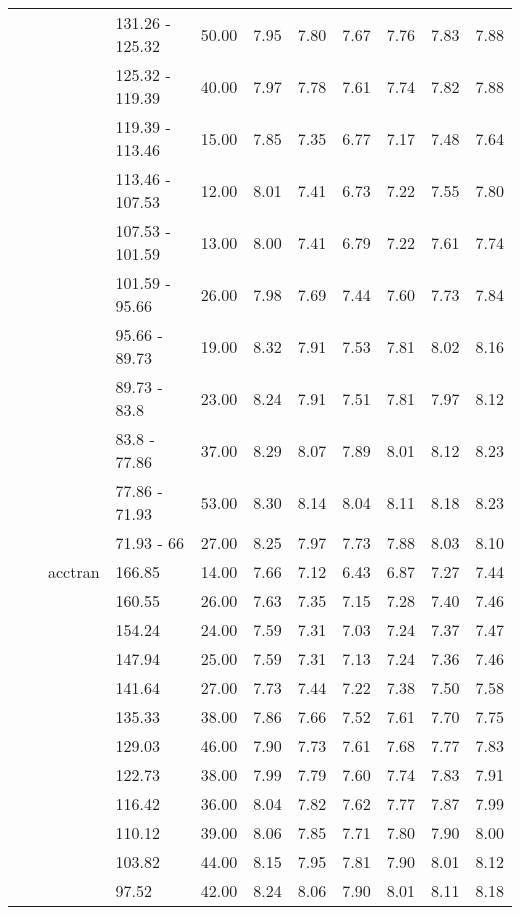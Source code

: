 \begin{longtable}{llllrrrrrrr}
   &  &  & 131.26 - 125.32 & 50.00 & 7.95 & 7.80 & 7.67 & 7.76 & 7.83 & 7.88 \\ 
   &  &  & 125.32 - 119.39 & 40.00 & 7.97 & 7.78 & 7.61 & 7.74 & 7.82 & 7.88 \\ 
   &  &  & 119.39 - 113.46 & 15.00 & 7.85 & 7.35 & 6.77 & 7.17 & 7.48 & 7.64 \\ 
   &  &  & 113.46 - 107.53 & 12.00 & 8.01 & 7.41 & 6.73 & 7.22 & 7.55 & 7.80 \\ 
   &  &  & 107.53 - 101.59 & 13.00 & 8.00 & 7.41 & 6.79 & 7.22 & 7.61 & 7.74 \\ 
   &  &  & 101.59 - 95.66 & 26.00 & 7.98 & 7.69 & 7.44 & 7.60 & 7.73 & 7.84 \\ 
   &  &  & 95.66 - 89.73 & 19.00 & 8.32 & 7.91 & 7.53 & 7.81 & 8.02 & 8.16 \\ 
   &  &  & 89.73 - 83.8 & 23.00 & 8.24 & 7.91 & 7.51 & 7.81 & 7.97 & 8.12 \\ 
   &  &  & 83.8 - 77.86 & 37.00 & 8.29 & 8.07 & 7.89 & 8.01 & 8.12 & 8.23 \\ 
   &  &  & 77.86 - 71.93 & 53.00 & 8.30 & 8.14 & 8.04 & 8.11 & 8.18 & 8.23 \\ 
   &  &  & 71.93 - 66 & 27.00 & 8.25 & 7.97 & 7.73 & 7.88 & 8.03 & 8.10 \\ 
   &  & acctran & 166.85 & 14.00 & 7.66 & 7.12 & 6.43 & 6.87 & 7.27 & 7.44 \\ 
   &  &  & 160.55 & 26.00 & 7.63 & 7.35 & 7.15 & 7.28 & 7.40 & 7.46 \\ 
   &  &  & 154.24 & 24.00 & 7.59 & 7.31 & 7.03 & 7.24 & 7.37 & 7.47 \\ 
   &  &  & 147.94 & 25.00 & 7.59 & 7.31 & 7.13 & 7.24 & 7.36 & 7.46 \\ 
   &  &  & 141.64 & 27.00 & 7.73 & 7.44 & 7.22 & 7.38 & 7.50 & 7.58 \\ 
   &  &  & 135.33 & 38.00 & 7.86 & 7.66 & 7.52 & 7.61 & 7.70 & 7.75 \\ 
   &  &  & 129.03 & 46.00 & 7.90 & 7.73 & 7.61 & 7.68 & 7.77 & 7.83 \\ 
   &  &  & 122.73 & 38.00 & 7.99 & 7.79 & 7.60 & 7.74 & 7.83 & 7.91 \\ 
   &  &  & 116.42 & 36.00 & 8.04 & 7.82 & 7.62 & 7.77 & 7.87 & 7.99 \\ 
   &  &  & 110.12 & 39.00 & 8.06 & 7.85 & 7.71 & 7.80 & 7.90 & 8.00 \\ 
   &  &  & 103.82 & 44.00 & 8.15 & 7.95 & 7.81 & 7.90 & 8.01 & 8.12 \\ 
   &  &  & 97.52 & 42.00 & 8.24 & 8.06 & 7.90 & 8.01 & 8.11 & 8.18 \\ 

\end{longtable}
